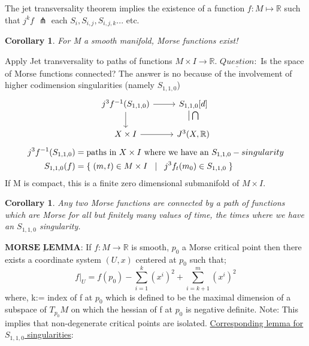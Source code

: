 \documentclass{article}
\newtheorem{corollary}[theorem]{Corollary}
\newtheorem{proposed work}[theorem]{Proposed Work}
\theoremstyle{definition}
\begin{document}
The jet transversality theorem implies the existence of a function $f:M\mapsto \mathbb{R}$ such that $j^{k}f$ $\pitchfork$ each $S_i,S_{i,j},S_{i,j,k}...$ etc.
\begin{corollary}
For M a smooth manifold, Morse functions exist! 
\end{corollary} 
Apply Jet transversality to paths of functions $M\times I\to \mathbb{R}.$
\newline
$\underline{Question}:$
Is the space of Morse functions connected?
The answer is no because of the involvement of higher codimension singularities (namely $S_{1,1,0}$)
\newline
\newline
\begin{equation*}
\begin{tikzcd}
j^3f^{-1}(S_{1,1,0}) \arrow[r] \arrow[d] \arrow[dr, phantom, , very near start]
& S_{1,1,0}   
 [d] \arrow[d, phantom,"\big| \bigcap" , near start] \\
X\times I \arrow[r]
& J^3(X,\mathbb{R})
\end{tikzcd}
\end{equation*}
\newline
\newline
\begin{align*}
j^3f^{-1}(S_{1,1,0})&=\text{paths in $X\times I$ where we have an $S_{1,1,0}-singularity$}\\ 
S_{1,1,0}(f)&=\{\hspace{1mm}(m,t)\in M\times I \hspace{3mm}|\hspace{3mm} j^3f_t(m_0)\in S_{1,1,0}\hspace{1mm}\}
\end{align*}
\newline
\newline
If M is compact, this is a finite zero dimensional submanifold of $M\times I$.

\begin{corollary}
Any two Morse functions are connected by a path of functions which are Morse for all but finitely many values of time, the times where we have an $S_{1,1,0}$ singularity.
\end{corollary}
$\underline{\textbf{MORSE LEMMA:}}$
If $f\colon M \to \mathbb{R}$ is smooth, $p_0$ a Morse critical point then there exists a coordinate system $(U,x)$ centered at $p_0$ such that;
$$f|_{U}=f(p_0)-\sum_{i=1}^{k}(x^i)^2+\sum_{i=k+1}^{m}(x^i)^2$$
where, k:= index of f at $p_0$ which is defined to be the maximal dimension of a subspace of $T_{p_0}M$ on which the hessian of f at $p_0$ is negative definite. 
\newline
Note: This implies that non-degenerate critical points are isolated. 
\newline
\newline
\underline{Corresponding lemma for $S_{1,1,0}$ singularities}:
\end{document}
